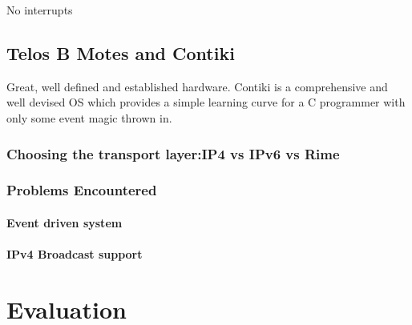 \documentclass{l4proj}
\begin{document}
No interrupts


\section{Telos B Motes and Contiki} %
\label{sec:contiki}
Great, well defined and established hardware.
Contiki is a comprehensive and well devised OS which provides a simple learning curve for a C programmer with only some event magic thrown in.

\subsection{Choosing the transport layer:IP4 vs IPv6 vs Rime} %
\label{sub:ip4_vs_ipv6_vs_rime}


\subsection{Problems Encountered} %
\label{sub:problems_encountered}

\subsubsection{Event driven system} %
\label{sub:event_driven_system}


\subsubsection{IPv4 Broadcast support} %
\label{sub:ipv4_broadcast_support}






\chapter{Evaluation} %
\label{cha:evaluation}


\end{document}
